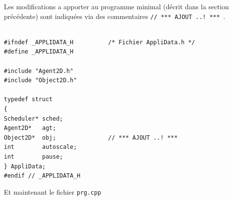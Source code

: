 \documentclass[12pt]{article}
\begin{document}
\vspace{0.4cm}
Les modifications a apporter au programme minimal
(d\'ecrit dans la section pr\'ec\'edente) sont indiqu\'ees via
des commentaires {\tt // *** AJOUT ..! *** }.

\begin{small}
\begin{verbatim}

#ifndef _APPLIDATA_H          /* Fichier AppliData.h */
#define _APPLIDATA_H

#include "Agent2D.h"
#include "Object2D.h"

typedef struct
{
Scheduler* sched;
Agent2D*   agt;
Object2D*  obj;               // *** AJOUT ..! ***
int        autoscale;
int        pause;
} AppliData;
#endif // _APPLIDATA_H
\end{verbatim}
\end{small}

Et maintenant le fichier {\tt prg.cpp}
\end{document}
